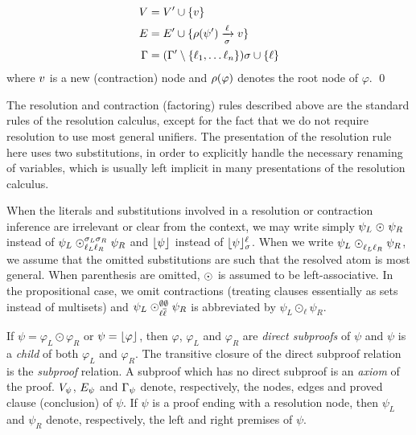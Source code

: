 \begin{definition}
\begin{itemize}
    \begin{align*}
      V &= V' \cup \{\n \} \\
      E &= E' \cup \{ \raiz{\psi'} \xrightarrow[\sigma]{\ell} \n \} \\
     \Gamma &= (\clause' \setminus \{ \ell_1, \ldots \ell_n \} ) \sigma \cup \{ \ell \}
    \end{align*}
    where $\n$ is a new (contraction) node and $\raiz{\varphi}$ denotes the root node of $\varphi$.
  \qed
\end{itemize}
\end{definition}


\noindent
The resolution and contraction (factoring) rules described above are the standard rules of the resolution calculus, except for the fact that we do not require resolution to use most general unifiers. The presentation of the resolution rule here uses two substitutions, in order to explicitly handle the necessary renaming of variables, which is usually left implicit in many presentations of the resolution calculus.

When the literals and substitutions involved in a resolution or contraction inference are irrelevant or clear from the context, we may write simply $\psi_L \res{}{}{}{} \psi_R$ instead of $\psi_L \res{\ell_L}{\sigma_L}{\ell_R}{\sigma_R} \psi_R$ and $\con{\psi}{}{}$ instead of $\con{\psi}{\sigma}{\ell}$. When we write $\psi_L \res{\ell_L}{}{\ell_R}{} \psi_R$, we assume that the omitted substitutions are such that the resolved atom is most general.
When parenthesis are omitted, $\res{}{}{}{}$ is assumed to be left-associative. In the propositional case, we omit contractions (treating clauses essentially as sets instead of multisets) and $\psi_L \res{\ell}{\emptyset}{\dual{\ell}}{\emptyset} \psi_R$ is abbreviated by $\psi_L \odot_{\ell} \psi_R$.

If $\psi = \varphi_L \odot \varphi_R$ or $\psi = \con{\varphi}{}{}$, then $\varphi$, $\varphi_L$ and $\varphi_R$ are \emph{direct
subproofs} of $\psi$ and $\psi$ is a \emph{child} of both $\varphi_L$ and $\varphi_R$. The
transitive closure of the direct subproof relation is the \emph{subproof} relation. A subproof which
has no direct subproof is an \emph{axiom} of the proof.
%
$\Vertices{\psi}$, $\Edges{\psi}$ and $\Conclusion{\psi}$
denote, respectively, the nodes, edges and proved clause (conclusion) of $\psi$. If $\psi$ is a proof ending with a resolution node, then $\psi_L$ and $\psi_R$ denote, respectively, the left and right premises of $\psi$.
